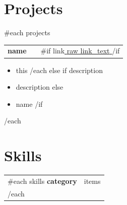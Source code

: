 \documentclass[a4paper,10pt]{article}
\newenvironment{project}{
  \begin{itemize}[nosep, leftmargin=1em, itemsep=1pt, label=--, topsep=2pt, partopsep=0pt]
}{%
  \end{itemize}%
  \vspace{3pt}%
}
\begin{document}
\section{Projects}
{{#each projects}}
\begin{tabularx}{\linewidth}{@{}l X r@{}}
  \textbf{ {{name}} } & & {{#if link}}\small\href{ {{raw link}} }{ {{raw link_text}} }{{/if}}
\end{tabularx}%
\vspace{-4pt}%
\begin{project}
{{#if bulletPoints}}
{{#each bulletPoints}}
  \item {{this}}
{{/each}}
{{else if description}}
  \item {{description}}
{{else}}
  \item {{name}}
{{/if}}
\end{project}
{{/each}}

\section{Skills}
\begin{tabularx}{\linewidth}{@{}l X@{}}
{{#each skills}}
\textbf{ {{category}} } & {{items}} \\
{{/each}}
\end{tabularx}

\vfill
\end{document}
